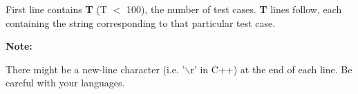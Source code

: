 First line contains   \textbf{    T   }   (T $<$ 100), the number of test cases.   \textbf{    T   }   lines follow, each containing the string corresponding to that particular test case.  

\textbf{    Note:   }

   There might be a new-line character (i.e. '$\backslash$r' in C++) at the end of each line. Be careful with your languages.